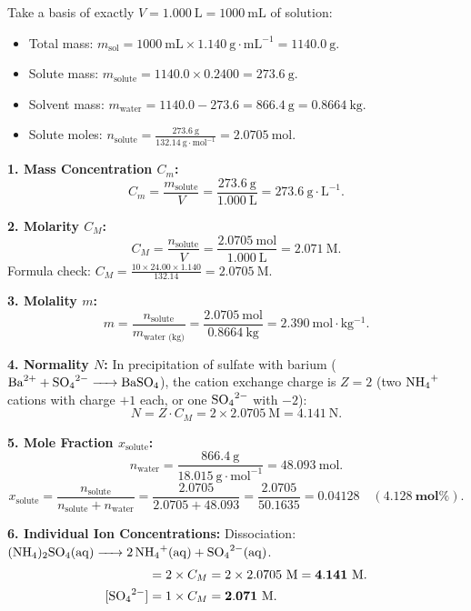 \begin{solution}
Take a basis of exactly $V = 1.000\ \mathrm{L} = 1000\ \mathrm{mL}$ of solution:
\begin{itemize}[itemsep=1pt]
  \item Total mass: $m_{\text{sol}} = 1000\ \mathrm{mL} \times 1.140\ \mathrm{g\cdot mL^{-1}} = 1140.0\ \mathrm{g}$.
  \item Solute mass: $m_{\text{solute}} = 1140.0 \times 0.2400 = 273.6\ \mathrm{g}$.
  \item Solvent mass: $m_{\text{water}} = 1140.0 - 273.6 = 866.4\ \mathrm{g} = 0.8664\ \mathrm{kg}$.
  \item Solute moles: $n_{\text{solute}} = \frac{273.6\ \mathrm{g}}{132.14\ \mathrm{g\cdot mol^{-1}}} = 2.0705\ \mathrm{mol}$.
\end{itemize}

\textbf{1. Mass Concentration $C_m$:}
\[
C_m = \frac{m_{\text{solute}}}{V} = \frac{273.6\ \mathrm{g}}{1.000\ \mathrm{L}} = \mathbf{273.6\ \mathrm{g\cdot L^{-1}}}.
\]

\textbf{2. Molarity $C_M$:}
\[
C_M = \frac{n_{\text{solute}}}{V} = \frac{2.0705\ \mathrm{mol}}{1.000\ \mathrm{L}} = \mathbf{2.071\ \mathrm{M}}.
\]
Formula check: $C_M = \frac{10 \times 24.00 \times 1.140}{132.14} = 2.0705\ \mathrm{M}$.

\textbf{3. Molality $m$:}
\[
m = \frac{n_{\text{solute}}}{m_{\text{water (kg)}}} = \frac{2.0705\ \mathrm{mol}}{0.8664\ \mathrm{kg}} = \mathbf{2.390\ \mathrm{mol\cdot kg^{-1}}}.
\]

\textbf{4. Normality $N$:}
In precipitation of sulfate with barium ($\ce{Ba^{2+} + SO4^{2-} -> BaSO4}$), the cation exchange charge is $Z = 2$ (two $\ce{NH4+}$ cations with charge $+1$ each, or one $\ce{SO4^{2-}}$ with $-2$):
\[
N = Z \cdot C_M = 2 \times 2.0705\ \mathrm{M} = \mathbf{4.141\ \mathrm{N}}.
\]

\textbf{5. Mole Fraction $x_{\text{solute}}$:}
\[
n_{\text{water}} = \frac{866.4\ \mathrm{g}}{18.015\ \mathrm{g\cdot mol^{-1}}} = 48.093\ \mathrm{mol}.
\]
\[
x_{\text{solute}} = \frac{n_{\text{solute}}}{n_{\text{solute}} + n_{\text{water}}} = \frac{2.0705}{2.0705 + 48.093} = \frac{2.0705}{50.1635} = \mathbf{0.04128} \quad (\mathbf{4.128\ \text{mol}\%}).
\]

\textbf{6. Individual Ion Concentrations:}
Dissociation: $(\ce{NH4})_2\ce{SO4(aq) -> 2 NH4+(aq) + SO4^{2-}(aq)}$.
\begin{align*}
[\ce{NH4+}] &= 2 \times C_M = 2 \times 2.0705\ \mathrm{M} = \mathbf{4.141\ \mathrm{M}}. \\
[\ce{SO4^{2-}}] &= 1 \times C_M = \mathbf{2.071\ \mathrm{M}}.
\end{align*}
\end{solution}

